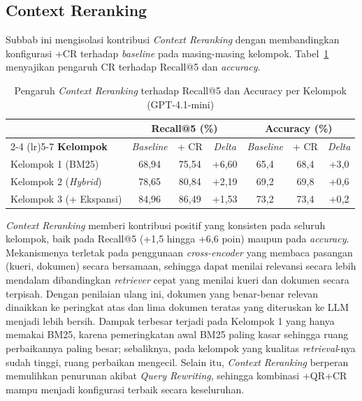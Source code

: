 \subsection{Context Reranking}
\label{subsec:efek-cr}

Subbab ini mengisolasi kontribusi \textit{Context Reranking} dengan membandingkan konfigurasi +CR terhadap \textit{baseline} pada masing-masing kelompok. Tabel~\ref{tbl:efek-cr} menyajikan pengaruh CR terhadap Recall@5 dan \textit{accuracy}.

\begin{table}[H]
\centering
\small
\setlength{\tabcolsep}{6pt}
\caption{Pengaruh \textit{Context Reranking} terhadap Recall@5 dan Accuracy per Kelompok (GPT-4.1-mini)}
\label{tbl:efek-cr}
\begin{tabular}{lcccccc}
\toprule
& \multicolumn{3}{c}{\textbf{Recall@5 (\%)}} & \multicolumn{3}{c}{\textbf{Accuracy (\%)}} \\
\cmidrule(lr){2-4} \cmidrule(lr){5-7}
\textbf{Kelompok} & \textit{Baseline} & + CR & \textit{Delta} & \textit{Baseline} & + CR & \textit{Delta} \\
\midrule
Kelompok 1 (BM25)             & 68{,}94 & 75{,}54 & +6{,}60 & 65{,}4 & 68{,}4 & +3{,}0 \\
Kelompok 2 (\textit{Hybrid})  & 78{,}65 & 80{,}84 & +2{,}19 & 69{,}2 & 69{,}8 & +0{,}6 \\
Kelompok 3 (+ Ekspansi)       & 84{,}96 & 86{,}49 & +1{,}53 & 73{,}2 & 73{,}4 & +0{,}2 \\
\bottomrule
\end{tabular}
\end{table}

\textit{Context Reranking} memberi kontribusi positif yang konsisten pada seluruh kelompok, baik pada Recall@5 (+1{,}5 hingga +6{,}6 poin) maupun pada \textit{accuracy}. Mekanismenya terletak pada penggunaan \textit{cross-encoder} yang membaca pasangan (kueri, dokumen) secara bersamaan, sehingga dapat menilai relevansi secara lebih mendalam dibandingkan \textit{retriever} cepat yang menilai kueri dan dokumen secara terpisah. Dengan penilaian ulang ini, dokumen yang benar-benar relevan dinaikkan ke peringkat atas dan lima dokumen teratas yang diteruskan ke LLM menjadi lebih bersih. Dampak terbesar terjadi pada Kelompok 1 yang hanya memakai BM25, karena pemeringkatan awal BM25 paling kasar sehingga ruang perbaikannya paling besar; sebaliknya, pada kelompok yang kualitas \textit{retrieval}-nya sudah tinggi, ruang perbaikan mengecil. Selain itu, \textit{Context Reranking} berperan memulihkan penurunan akibat \textit{Query Rewriting}, sehingga kombinasi +QR+CR mampu menjadi konfigurasi terbaik secara keseluruhan.


